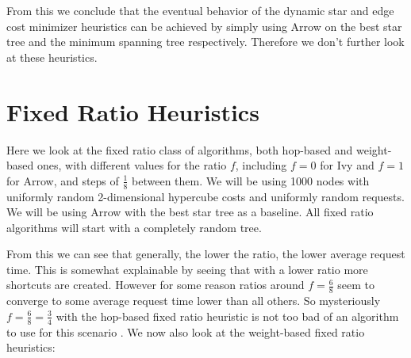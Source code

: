 \documentclass[a4paper, oneside]{discothesis}
\begin{document}
From this we conclude that the eventual behavior of the dynamic star and edge cost minimizer heuristics can be achieved by simply using Arrow on the best star tree and the minimum spanning tree respectively. Therefore we don't further look at these heuristics.

\section{Fixed Ratio Heuristics}

Here we look at the fixed ratio class of algorithms, both hop-based and weight-based ones, with different values for the ratio $f$, including $f=0$ for Ivy and $f=1$ for Arrow, and steps of $\frac{1}{8}$ between them. We will be using 1000 nodes with uniformly random 2-dimensional hypercube costs and uniformly random requests. We will be using Arrow with the best star tree as a baseline. All fixed ratio algorithms will start with a completely random tree.


From this we can see that generally, the lower the ratio, the lower average request time. This is somewhat explainable by seeing that with a lower ratio more shortcuts are created. However for some reason ratios around $f=\frac{6}{8}$ seem to converge to some average request time lower than all others. So mysteriously $f=\frac{6}{8}=\frac{3}{4}$ with the hop-based fixed ratio heuristic is not too bad of an algorithm to use for this scenario . We now also look at the weight-based fixed ratio heuristics:
\end{document}
